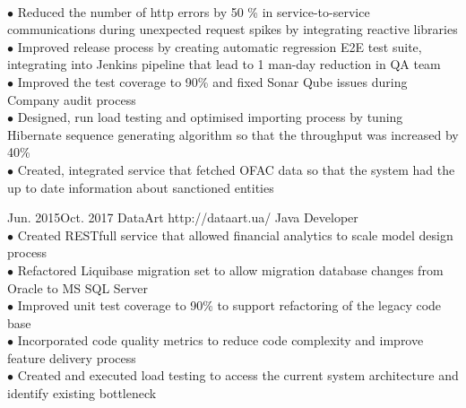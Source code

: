 \documentclass[10pt]{article} %
\begin{document}
{
\textbf{}    
\\$\bullet$ Reduced the number of http errors by 50 \% in service-to-service communications during unexpected request spikes by integrating reactive libraries 
\\$\bullet$ Improved release process by creating automatic regression E2E test suite, integrating into Jenkins pipeline that lead to 1 man-day reduction in QA team 
\\$\bullet$ Improved the test coverage to 90\% and fixed Sonar Qube issues during Company audit process
\\$\bullet$ Designed, run load testing and optimised importing process by tuning Hibernate sequence generating algorithm so that the throughput was increased by 40\%
\\$\bullet$ Created, integrated service that fetched OFAC data so that the system had the up to date information about sanctioned entities
 }

\job
{Jun. 2015}{Oct. 2017}
{DataArt}
{http://dataart.ua/}
{Java Developer}
{
\textbf{}  
\\$\bullet$ Created RESTfull service that allowed financial analytics to scale model design process 
\\$\bullet$ Refactored Liquibase migration set to allow migration database changes from Oracle to MS SQL Server
\\$\bullet$ Improved unit test coverage to 90\% to support refactoring of the legacy code base
\\$\bullet$ Incorporated code quality metrics to reduce code complexity and improve feature delivery process
\\$\bullet$ Created and executed load testing to access the current system architecture and identify existing bottleneck 
 }
\end{document}
